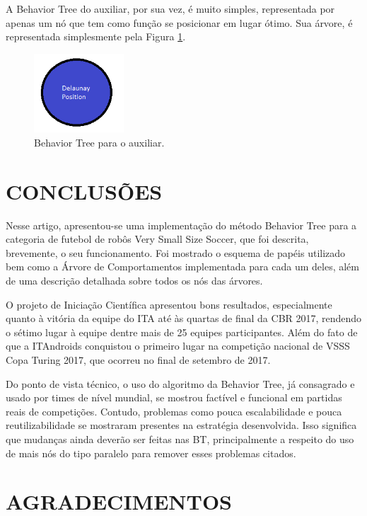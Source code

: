 \documentclass[10pt,fleqn,a4paper]{article}
\begin{document}
	A Behavior Tree do auxiliar, por sua vez, é muito simples, representada por apenas um nó que tem como função se posicionar em lugar ótimo. Sua árvore, é representada simplesmente pela Figura \ref{fig:auxiliar_bt}.

\begin{figure}[H]
	\centering
	\includegraphics[width=0.3\textwidth]{figures/Auxiliar_BT.png}
   \caption{Behavior Tree para o auxiliar.} \label{fig:auxiliar_bt}
\end{figure}

	\section{CONCLUSÕES}
	Nesse artigo, apresentou-se uma implementação do método Behavior Tree para a categoria de futebol de robôs Very Small Size Soccer, que foi descrita, brevemente, o seu funcionamento. Foi mostrado o esquema de papéis utilizado bem como a Árvore de Comportamentos implementada para cada um deles, além de uma descrição detalhada sobre todos os nós das árvores.
	
	O projeto de Iniciação Científica apresentou bons resultados, especialmente quanto à vitória da equipe do ITA até às quartas de final da CBR 2017, rendendo o sétimo lugar à equipe dentre mais de 25 equipes participantes. Além do fato de que a ITAndroids conquistou o primeiro lugar na competição nacional de VSSS Copa Turing 2017, que ocorreu no final de setembro de 2017.

	Do ponto de vista técnico, o uso do algoritmo da Behavior Tree, já consagrado e usado por times de nível mundial, se mostrou factível e funcional em partidas reais de competições. Contudo, problemas como pouca escalabilidade e pouca reutilizabilidade se mostraram presentes na estratégia desenvolvida. Isso significa que mudanças ainda deverão ser feitas nas BT, principalmente a respeito do uso de mais nós do tipo paralelo para remover esses problemas citados.

    \section{AGRADECIMENTOS}
    
\end{document}
